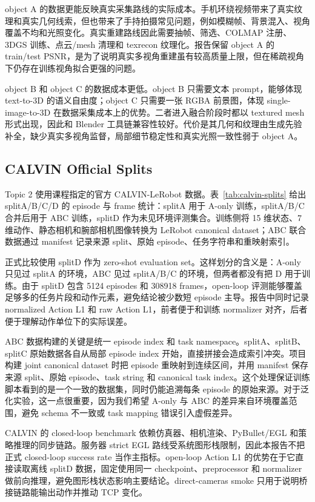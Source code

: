 \documentclass{article}
\begin{document}
	object A 的数据更能反映真实采集路线的实际成本。手机环绕视频带来了真实纹理和真实几何线索，但也带来了手持拍摄常见问题，例如模糊帧、背景混入、视角覆盖不均和光照变化。真实重建路线因此需要抽帧、筛选、COLMAP 注册、3DGS 训练、点云/mesh 清理和 texrecon 纹理化。报告保留 object A 的 train/test PSNR，是为了说明真实多视角重建虽有较高质量上限，但在稀疏视角下仍存在训练视角拟合更强的问题。

	object B 和 object C 的数据成本更低。object B 只需要文本 prompt，能够体现 text-to-3D 的语义自由度；object C 只需要一张 RGBA 前景图，体现 single-image-to-3D 在数据采集成本上的优势。二者进入融合阶段时都以 textured mesh 形式出现，因此和 Blender 工具链兼容性较好。代价是其几何和纹理由生成先验补全，缺少真实多视角监督，局部细节稳定性和真实光照一致性弱于 object A。

	\subsection{CALVIN Official Splits}

	Topic 2 使用课程指定的官方 CALVIN-LeRobot 数据。表~\ref{tab:calvin-splits} 给出 splitA/B/C/D 的 episode 与 frame 统计：splitA 用于 A-only 训练，splitA/B/C 合并后用于 ABC 训练，splitD 作为未见环境评测集合。训练侧将 15 维状态、7 维动作、静态相机和腕部相机图像转换为 LeRobot canonical dataset；ABC 联合数据通过 manifest 记录来源 split、原始 episode、任务字符串和重映射索引。

	正式比较使用 splitD 作为 zero-shot evaluation set。这样划分的含义是：A-only 只见过 splitA 的环境，ABC 见过 splitA/B/C 的环境，但两者都没有把 D 用于训练。由于 splitD 包含 5124 episodes 和 308918 frames，open-loop 评测能够覆盖足够多的任务片段和动作元素，避免结论被少数短 episode 主导。报告中同时记录 normalized Action L1 和 raw Action L1，前者便于和训练 normalizer 对齐，后者便于理解动作单位下的实际误差。

	ABC 数据构建的关键是统一 episode index 和 task namespace。splitA、splitB、splitC 原始数据各自从局部 episode index 开始，直接拼接会造成索引冲突。项目构建 joint canonical dataset 时把 episode 重映射到连续区间，并用 manifest 保存来源 split、原始 episode、task string 和 canonical task index。这个处理保证训练脚本看到的是一个一致的数据集，同时仍能追溯每条 episode 的原始来源。对于泛化实验，这一点很重要，因为我们希望 A-only 与 ABC 的差异来自环境覆盖范围，避免 schema 不一致或 task mapping 错误引入虚假差异。

	CALVIN 的 closed-loop benchmark 依赖仿真器、相机渲染、PyBullet/EGL 和策略推理的同步链路。服务器 strict EGL 路线受系统图形栈限制，因此本报告不把正式 closed-loop success rate 当作主指标。open-loop Action L1 的优势在于它直接读取离线 splitD 数据，固定使用同一 checkpoint、preprocessor 和 normalizer 做前向推理，避免图形栈状态影响主要结论。direct-cameras smoke 只用于说明桥接链路能输出动作并推动 TCP 变化。
\end{document}
